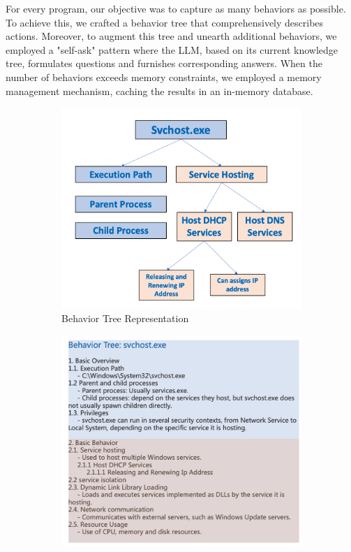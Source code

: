 For every program, our objective was to capture as many behaviors as possible. To achieve this, we crafted a behavior tree that comprehensively describes actions. Moreover, to augment this tree and unearth additional behaviors, we employed a "self-ask" pattern where the LLM, based on its current knowledge tree, formulates questions and furnishes corresponding answers. When the number of behaviors exceeds memory constraints, we employed a memory management mechanism, caching the results in an in-memory database.

\begin{figure}[h]
    \centering
    \begin{subfigure}{0.48\textwidth}
      \includegraphics[width=1\textwidth]{figs/tree1.jpg}
      \caption{Behavior Tree Representation}
    \end{subfigure}
    \begin{subfigure}{0.48\textwidth}
    \includegraphics[width=1\textwidth]{figs/tree2.jpg}

\end{subfigure}
\end{figure}
